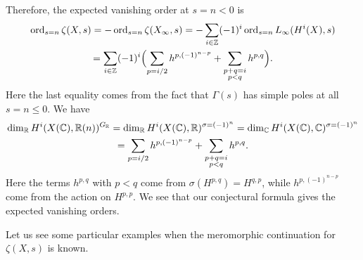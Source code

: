 \documentclass{article}
\numberwithin{equation}{section}
\begin{document}
\begin{remark}
  Therefore, the expected vanishing order at $s = n < 0$ is
  \begin{multline*}
    \operatorname{ord}_{s=n} \zeta (X,s) = -\operatorname{ord}_{s=n} \zeta (X_\infty,s)
    = -\sum_{i\in \mathbb{Z}} (-1)^i \operatorname{ord}_{s=n} L_\infty (H^i (X), s) \\
    = \sum_{i\in \mathbb{Z}} (-1)^i \Bigl(\sum_{p = i/2} h^{p,(-1)^{n-p}} +
    \sum_{\substack{p + q = i \\ p < q}} h^{p,q}\Bigr).
  \end{multline*}
  Here the last equality comes from the fact that $\Gamma (s)$ has simple poles
  at all $s = n \le 0$. We have
  \begin{multline*}
    \dim_{\mathbb{R}} H^i (X (\mathbb{C}), \mathbb{R} (n))^{G_{\mathbb{R}}} =
    \dim_{\mathbb{R}} H^i (X (\mathbb{C}), \mathbb{R})^{\sigma = (-1)^n} =
    \dim_{\mathbb{C}} H^i (X (\mathbb{C}), \mathbb{C})^{\sigma = (-1)^n} \\
    = \sum_{p = i/2} h^{p,(-1)^{n-p}} +
    \sum_{\substack{p + q = i \\ p < q}} h^{p,q}.
  \end{multline*}
  Here the terms $h^{p,q}$ with $p < q$ come from $\sigma (H^{p,q}) = H^{q,p}$,
  while $h^{p,(-1)^{n-p}}$ come from the action on $H^{p,p}$.
  We see that our conjectural formula gives the expected vanishing orders.
\end{remark}

Let us see some particular examples when the meromorphic continuation for
$\zeta (X,s)$ is known.
\end{document}
